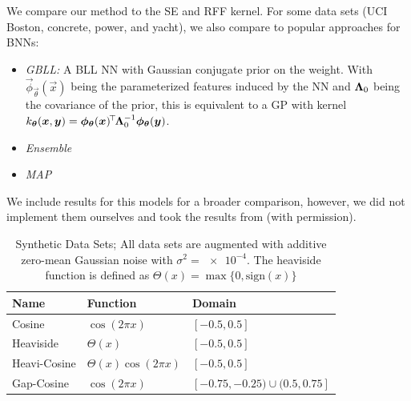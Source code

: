 	We compare our method to the \ac{SE} and \ac{RFF} kernel.
	For some data sets (\ac{UCI} Boston, concrete, power, and yacht), we also compare to popular approaches for \acp{BNN}:
	\begin{itemize}
		\item \emph{\ac{GBLL}:}
			A \ac{BLL} \ac{NN} with Gaussian conjugate prior on the weight. With $\vec{\phi}_{\vec{\theta}}(\vec{x})$ being the parameterized features induced by the \ac{NN} and $\bm{\mathrm{\Lambda}}_0$ being the covariance of the prior, this is equivalent to a \ac{GP} with kernel $k_{\bm{\theta}}(\bm{x}, \bm{y}) = \bm{\phi}_{\bm{\theta}}(\bm{x})^{\!\top\!} \bm{\mathrm{\Lambda}}_0^{-1} \bm{\phi}_{\bm{\theta}}(\bm{y})$\cite{rasmussenGaussianProcessesMachine2006}.
		\item \emph{Ensemble}\cite{lakshminarayananSimpleScalablePredictive2017}
		\item \emph{\ac{MAP}}
	\end{itemize}
	We include results for this models for a broader comparison, however, we did not implement them ourselves and took the results from\cite{watsonLatentDerivativeBayesian2021} (with permission).

	\begin{table}
		\centering
		\begin{tabular}{lll}
			\toprule
			\textbf{Name}         & \textbf{Function}         & \textbf{Domain}                   \\ \midrule
			Cosine                & $\cos(2 \pi x)$           & $[-0.5, 0.5]$                     \\
			Heaviside\superdagger & $\Theta(x)$               & $[-0.5, 0.5]$                     \\
			Heavi-Cosine          & $\Theta(x) \cos(2 \pi x)$ & $[-0.5, 0.5]$                     \\
			Gap-Cosine            & $\cos(2 \pi x)$           & $[-0.75, -0.25) \cup (0.5, 0.75]$ \\ \bottomrule
		\end{tabular}
		\caption{
			Synthetic Data Sets;
			All data sets are augmented with additive zero-mean Gaussian noise with $\sigma^2 = \num{e-4}$.
			\superdagger{}The heaviside function is defined as $ \Theta(x) = \max\{ 0, \mathrm{sign}(x) \} $
		}
		\label{tab:dataSynthetic}
	\end{table}


